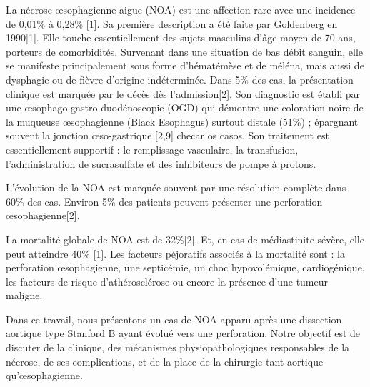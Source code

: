 \documentclass[./tfe.tex]{subfiles}
\begin{document}
La nécrose œsophagienne aigue (NOA) est une affection rare avec une incidence de 0,01\% à 0,28\% [1]. Sa première description a été faite par Goldenberg en 1990[1]. Elle touche essentiellement des sujets masculins d’âge moyen de 70 ans, porteurs de comorbidités. Survenant dans une situation de bas débit sanguin, elle se manifeste principalement sous forme d'hématémèse et de méléna, mais aussi de dysphagie ou de fièvre d'origine indéterminée. Dans 5\% des cas, la présentation clinique est marquée par le décès dès l’admission[2]. Son diagnostic est établi par une œsophago-gastro-duodénoscopie (OGD) qui démontre une coloration noire de la muqueuse œsophagienne (Black Esophagus) surtout distale (51\%) ; épargnant souvent la jonction œso-gastrique [2,9] checar os casos. Son traitement est essentiellement supportif : le remplissage vasculaire, la transfusion, l’administration de sucrasulfate et des inhibiteurs de pompe à protons.

L’évolution de la NOA est marquée souvent par une résolution complète dans 60\% des cas. Environ 5\% des patients peuvent présenter une perforation œsophagienne[2].

La mortalité globale de NOA est de 32\%[2]. Et, en cas de médiastinite sévère, elle peut atteindre 40\% [1]. Les facteurs péjoratifs associés à la mortalité sont : la perforation œsophagienne, une septicémie, un choc hypovolémique, cardiogénique, les facteurs de risque d’athérosclérose ou encore la présence d’une tumeur maligne.

Dans ce travail, nous présentons un cas de NOA apparu après une dissection aortique type Stanford B ayant évolué vers une perforation. Notre objectif est de discuter de la clinique, des mécanismes physiopathologiques responsables de la nécrose, de ses complications, et de la place de la chirurgie tant aortique qu’œsophagienne.
\end{document}
